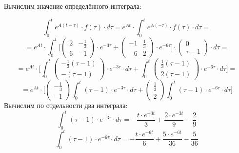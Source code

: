 Вычислим значение определённого интеграла:

\begin{displaymath}
\int_0^t e^{A(t - \tau)} \cdot f(\tau) \cdot d \tau = e^{At} \cdot \int_0^t e^{A(-\tau)} \cdot f(\tau) \cdot d \tau =
\end{displaymath}
\begin{displaymath}
= e^{At} \cdot \int_0^t \Big [ \begin{pmatrix}
2 & - \frac{1}{3}
\\
6 & -1
\end{pmatrix} \cdot e^{-3 \tau} + \begin{pmatrix}
-1 & \frac{1}{3}
\\
-6 & 2
\end{pmatrix} \cdot e^{-6 \tau} \Big ] \cdot \begin{pmatrix}
0
\\
\tau - 1
\end{pmatrix} \cdot d \tau =
\end{displaymath}
\begin{displaymath}
= e^{At} \cdot \Big [ \int_0^t \begin{pmatrix}
- \frac{1}{3} (\tau - 1)
\\
-(\tau - 1)
\end{pmatrix} \cdot e^{-3 \tau} \cdot d \tau + \int_0^t \begin{pmatrix}
\frac{1}{3} (\tau - 1)
\\
2 (\tau - 1)
\end{pmatrix} \cdot e^{-6 \tau} \cdot d \tau \Big ] = 
\end{displaymath}
\begin{displaymath}
= e^{At} \cdot \Big [  \begin{pmatrix}
- \frac{1}{3}
\\
- 1
\end{pmatrix} \int_0^t (\tau - 1) \cdot e^{-3 \tau} \cdot d \tau + \begin{pmatrix}
\frac{1}{3}
\\
2 
\end{pmatrix} \int_0^t (\tau - 1) \cdot e^{-6 \tau} \cdot d \tau \Big ]
\end{displaymath}
Вычислим по отдельности два интеграла:
\begin{displaymath}
\int_0^t (\tau - 1) \cdot e^{-3 \tau} \cdot d \tau = - \frac{t \cdot e^{-3t}}{3} + \frac{2 \cdot e^{-3t}}{9} - \frac{2}{9}
\end{displaymath}
\begin{displaymath}
\int_0^t (\tau - 1) \cdot e^{-6 \tau} \cdot d \tau = - \frac{t \cdot e^{-6t}}{6} + \frac{5 \cdot e^{-6t}}{36} - \frac{5}{36}
\end{displaymath}

